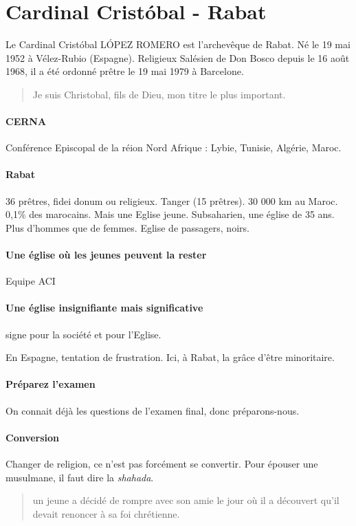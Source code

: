 \section{Cardinal Cristóbal - Rabat}

Le Cardinal Cristóbal LÓPEZ ROMERO est l'archevêque de Rabat. Né le 19 mai 1952 à Vélez-Rubio (Espagne). Religieux Salésien de Don Bosco depuis le 16 août 1968, il a été ordonné prêtre le 19 mai 1979 à Barcelone.

\begin{quote}
    Je suis Christobal, fils de Dieu, mon titre le plus important.
\end{quote}

\paragraph{CERNA} Conférence Episcopal de la réion Nord Afrique : Lybie, Tunisie, Algérie, Maroc. 

\paragraph{Rabat} 36 prêtres, fidei donum ou religieux. Tanger (15 prêtres). 30 000 km au Maroc. 0,1\% des marocains.
Mais une Eglise jeune. Subsaharien, une église de 35 ans. Plus d'hommes que de femmes. Eglise de passagers, noirs. 

\paragraph{Une église où les jeunes peuvent la rester}
Equipe ACI

\paragraph{Une église insignifiante mais significative}
signe pour la société et pour l'Eglise.

\begin{Def}
En Espagne, tentation de frustration. Ici, à Rabat, la grâce d'être minoritaire. 
\end{Def}
\paragraph{Préparez l'examen} On connait déjà les questions de l'examen final, donc préparons-nous.

\paragraph{Conversion} Changer de religion, ce n'est pas forcément se convertir. Pour épouser une musulmane, il faut dire la \textit{shahada}. 
\begin{quote}
    un jeune a décidé de rompre avec son amie le jour où il a découvert qu'il devait renoncer à sa foi chrétienne.
\end{quote}


